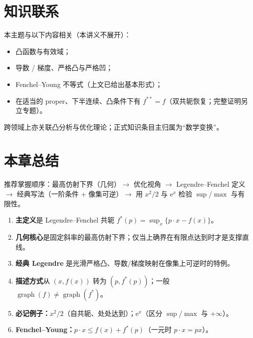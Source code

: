 \documentclass[
    lang=cn,
    color=blue,
    mode=fancy,
    thmcnt=section,
    scheme=chinese,
    chinesefont=ctexfont
]{elegantbook}
\newcommand{\e}{\mathrm{e}}
\newcommand{\fstar}{f^{\ast}}
\newcommand{\fstarp}{f^{\ast}(p)}
\begin{document}
\section{知识联系}

本主题与以下内容相关（本讲义不展开）：

\begin{itemize}
  \item 凸函数与有效域；
  \item 导数 / 梯度、严格凸与严格凹；
  \item Fenchel--Young 不等式（上文已给出基本形式）；
  \item 在适当的 proper、下半连续、凸条件下有 $f^{\ast\ast}=f$（双共轭恢复；完整证明另立专题）。
\end{itemize}

跨领域上亦关联凸分析与优化理论；正式知识条目主归属为``数学变换''。


\section{本章总结}

\begin{conclusion}
推荐掌握顺序：最高仿射下界（几何）$\to$ 优化视角 $\to$ Legendre--Fenchel 定义 $\to$ 经典写法（一阶条件 + 像集可逆）$\to$ 用 $x^{2}/2$ 与 $\e^{x}$ 检验 $\sup$/$\max$ 与有限性。
\end{conclusion}

\begin{enumerate}
  \item \textbf{主定义}是 Legendre--Fenchel 共轭 $\fstarp=\sup_{x}\{p\cdot x-f(x)\}$。
  \item \textbf{几何核心}是固定斜率的最高仿射下界；仅当上确界在有限点达到时才是支撑直线。
  \item \textbf{经典 Legendre} 是光滑严格凸、导数/梯度映射在像集上可逆时的特例。
  \item \textbf{描述方式}从 $(x,f(x))$ 转为 $(p,\fstarp)$；一般 $\operatorname{graph}(f)\neq\operatorname{graph}(\fstar)$。
  \item \textbf{必记例子：}$x^{2}/2$（自共轭、处处达到）；$\e^{x}$（区分 $\sup$/$\max$ 与 $+\infty$）。
  \item \textbf{Fenchel--Young：}$p\cdot x\le f(x)+\fstarp$（一元时 $p\cdot x=px$）。
\end{enumerate}


\appendix
\end{document}
